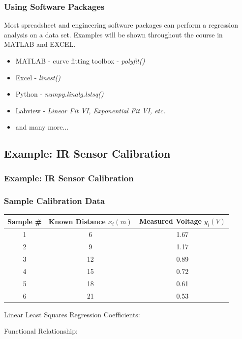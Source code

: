 \documentclass[fleqn]{ltx-talk} %
\newcommand{\sectionIIIsubsectionIIItitle}{Using Software Packages}
\newcommand{\sectionIIIsubsectionIVtitle}{Example: IR Sensor Calibration}
\begin{document}
			\begin{frame}
				\frametitle{\sectionIIIsubsectionIIItitle}

		 Most spreadsheet and engineering software packages can perform a {\GR regression analysis} on a
data set. Examples will be shown throughout the course in MATLAB and EXCEL.\vspcc
	\begin{itemize}
	
	\item MATLAB - curve fitting toolbox - {\itshape polyfit()}
	\item Excel - {\itshape linest()}
	\item Python - {\itshape numpy.linalg.lstsq() }
	\item Labview - {\itshape Linear Fit VI, Exponential Fit VI, etc.}
	\item and many more...
	
	\end{itemize}
		

			\end{frame}

	
		\subsection{\sectionIIIsubsectionIVtitle}\label{sectionIIIsubsectionIV}	

			\begin{frame}
				\frametitle{\sectionIIIsubsectionIVtitle}

\frametitle{Sample Calibration Data}
\begin{tabular}{|c|c|c|}\hline
Sample \# & Known Distance $x_i (m)$ & Measured Voltage $y_i (V)$ \\ \hline \hline
1&6	&1.67 \\ \hline
2&9	&1.17 \\ \hline
3&12&0.89 \\ \hline
4&15&0.72 \\ \hline
5&18&0.61 \\ \hline
6&21&0.53 \\ \hline
\end{tabular}

\vspace{5mm}
Linear Least Squares Regression Coefficients: 
 \vspc

Functional Relationship: \\

			\end{frame}
\end{document}
